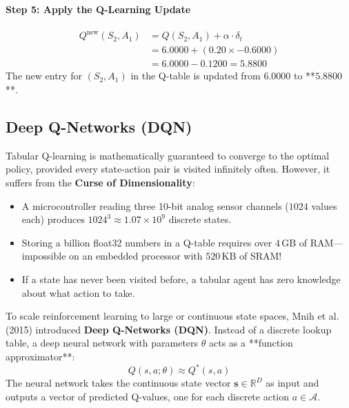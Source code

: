\begin{example}
\paragraph{Step 5: Apply the Q-Learning Update}
\begin{align*}
Q^{\text{new}}(S_2, A_1) &= Q(S_2, A_1) + \alpha \cdot \delta_t\\
&= 6.0000 + (0.20 \times -0.6000)\\
&= 6.0000 - 0.1200 = 5.8800
\end{align*}
The new entry for $(S_2, A_1)$ in the Q-table is updated from $6.0000$ to **$5.8800$**.
\end{example}

\subsection{Deep Q-Networks (DQN)}\label{subsec:dqn}

Tabular Q-learning is mathematically guaranteed to converge to the optimal policy, provided every state-action pair is visited infinitely often. However, it suffers from the \textbf{Curse of Dimensionality}:
\begin{itemize}
    \item A microcontroller reading three 10-bit analog sensor channels ($1024$ values each) produces $1024^3 \approx 1.07 \times 10^9$ discrete states.
    \item Storing a billion float32 numbers in a Q-table requires over $4\,\text{GB}$ of RAM---impossible on an embedded processor with $520\,\text{KB}$ of SRAM!
    \item If a state has never been visited before, a tabular agent has zero knowledge about what action to take.
\end{itemize}

To scale reinforcement learning to large or continuous state spaces, Mnih et al. (2015) introduced \textbf{Deep Q-Networks (DQN)}. Instead of a discrete lookup table, a deep neural network with parameters $\theta$ acts as a **function approximator**:
\begin{equation}
Q(s, a; \theta) \approx Q^*(s, a)\label{eq:dqn_function}
\end{equation}
The neural network takes the continuous state vector $\mathbf{s} \in \mathbb{R}^D$ as input and outputs a vector of predicted Q-values, one for each discrete action $a \in \mathcal{A}$.


